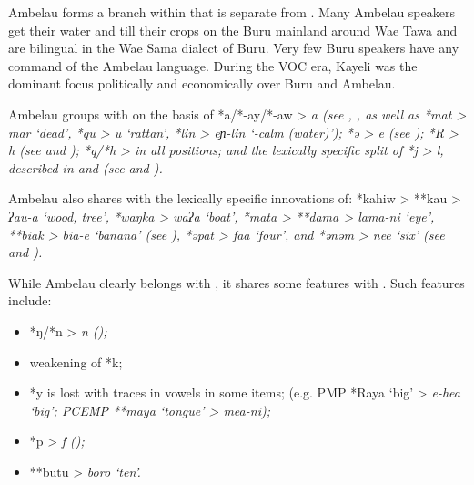 Ambelau forms a branch within  that is separate from .
Many Ambelau speakers get their water
and till their crops on the Buru mainland around Wae Tawa
and are bilingual in the Wae Sama dialect of Buru.
Very few Buru speakers have any command of the Ambelau language.
During the VOC era,
Kayeli was the dominant focus politically
and economically over Buru and Ambelau.

Ambelau groups with  on the basis of *a/*-ay/*-aw
> \it{a} (see , , as well as
*mat > \it{mar} ‘dead’,
*qu > \it{u} ‘rattan’,
*lin > \it{eɲ-lin} ‘-calm (water)’);
*ə > \it{e}
(see ); *R > \it{h} (see 
and ); *q/*h > {\0} in all positions;
and the lexically specific split of *j > \it{l},
{\0} described in 
and  (see  and ).

Ambelau also shares with  the lexically specific
innovations of: *kahiw > **kau > \it{ʔau-a} ‘wood,
tree’, *waŋka > \it{waʔa} ‘boat’,
*mata > **dama > \it{lama-ni} ‘eye’,
**biak > \it{bia-e} ‘banana’ (see ),
*əpat > \it{faa} ‘four’,
and *ənəm > \it{nee} ‘six’ (see  and ).

While Ambelau clearly belongs with ,
it shares some features with .
Such features include: 

\begin{itemize}
	\item	*ŋ/*n > \it{n} ();
	\item	weakening of *k;
	\item	*y is lost with traces in vowels in some items;
				(e.g. PMP *Raya ‘big’ > \it{e-hea} ‘big’;
				PCEMP **maya ‘tongue’ > \it{mea-ni});
	\item	*p > \it{f} ();
	\item	**butu > \it{boro} ‘ten’.
\end{itemize}

